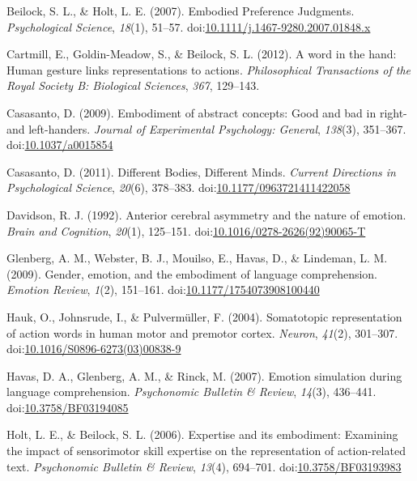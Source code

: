 \documentclass[english,man]{apa6}
\theoremstyle{definition}
\theoremstyle{definition}
\theoremstyle{definition}
\theoremstyle{remark}
\begin{document}
\hypertarget{ref-Beilock2007}{}
Beilock, S. L., \& Holt, L. E. (2007). Embodied Preference Judgments.
\emph{Psychological Science}, \emph{18}(1), 51--57.
doi:\href{https://doi.org/10.1111/j.1467-9280.2007.01848.x}{10.1111/j.1467-9280.2007.01848.x}

\hypertarget{ref-Cartmill2012}{}
Cartmill, E., Goldin-Meadow, S., \& Beilock, S. L. (2012). A word in the
hand: Human gesture links representations to actions.
\emph{Philosophical Transactions of the Royal Society B: Biological
Sciences}, \emph{367}, 129--143.

\hypertarget{ref-Casasanto2009}{}
Casasanto, D. (2009). Embodiment of abstract concepts: Good and bad in
right- and left-handers. \emph{Journal of Experimental Psychology:
General}, \emph{138}(3), 351--367.
doi:\href{https://doi.org/10.1037/a0015854}{10.1037/a0015854}

\hypertarget{ref-Casasanto2011}{}
Casasanto, D. (2011). Different Bodies, Different Minds. \emph{Current
Directions in Psychological Science}, \emph{20}(6), 378--383.
doi:\href{https://doi.org/10.1177/0963721411422058}{10.1177/0963721411422058}

\hypertarget{ref-Davidson1992}{}
Davidson, R. J. (1992). Anterior cerebral asymmetry and the nature of
emotion. \emph{Brain and Cognition}, \emph{20}(1), 125--151.
doi:\href{https://doi.org/10.1016/0278-2626(92)90065-T}{10.1016/0278-2626(92)90065-T}

\hypertarget{ref-Glenberg2009}{}
Glenberg, A. M., Webster, B. J., Mouilso, E., Havas, D., \& Lindeman, L.
M. (2009). Gender, emotion, and the embodiment of language
comprehension. \emph{Emotion Review}, \emph{1}(2), 151--161.
doi:\href{https://doi.org/10.1177/1754073908100440}{10.1177/1754073908100440}

\hypertarget{ref-Hauk2004}{}
Hauk, O., Johnsrude, I., \& Pulvermüller, F. (2004). Somatotopic
representation of action words in human motor and premotor cortex.
\emph{Neuron}, \emph{41}(2), 301--307.
doi:\href{https://doi.org/10.1016/S0896-6273(03)00838-9}{10.1016/S0896-6273(03)00838-9}

\hypertarget{ref-Havas2007}{}
Havas, D. A., Glenberg, A. M., \& Rinck, M. (2007). Emotion simulation
during language comprehension. \emph{Psychonomic Bulletin \& Review},
\emph{14}(3), 436--441.
doi:\href{https://doi.org/10.3758/BF03194085}{10.3758/BF03194085}

\hypertarget{ref-Holt2006}{}
Holt, L. E., \& Beilock, S. L. (2006). Expertise and its embodiment:
Examining the impact of sensorimotor skill expertise on the
representation of action-related text. \emph{Psychonomic Bulletin \&
Review}, \emph{13}(4), 694--701.
doi:\href{https://doi.org/10.3758/BF03193983}{10.3758/BF03193983}
\end{document}
